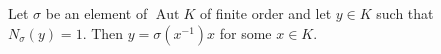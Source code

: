 Let $\sigma$ be an element of $\operatorname{Aut} K$ of finite order and let $y \in K$ such that $N_\sigma(y) = 1$. Then $y = \sigma(x^{-1})x$ for some $x \in K$.
